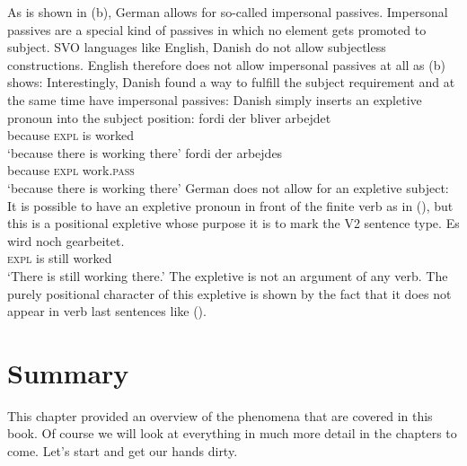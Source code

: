 As is shown in (b), German allows for so-called impersonal passives. Impersonal passives are
a special kind of passives in which no element gets promoted to subject. SVO languages like English,
Danish do not allow subjectless constructions. English therefore does not allow impersonal passives
at all as (b) shows:
\eal
{}
\zl
Interestingly, Danish found a way to fulfill the subject requirement and at the same time have
impersonal passives: Danish simply inserts an expletive pronoun into the subject position:
\eal
\label{ex-bliver-arbejder}
\ex 
\gll fordi der bliver arbejdet\\
     because \textsc{expl} is worked\\\danish
\glt `because there is working there'
\ex
\gll fordi   der arbejdes\\
     because  \textsc{expl} work.\textsc{pass}\\
\glt `because there is working there'
\zl
German does not allow for an expletive subject:
\z
It is possible to have an expletive pronoun in front of the finite verb as in (), but this is
a positional expletive whose purpose it is to mark the V2 sentence type. 
\ea
\gll  Es wird noch gearbeitet.\\
      \textsc{expl} is still worked\\\german
\glt `There is still working there.'
\z
The expletive is not an argument of any verb. The purely positional character of this expletive is shown by the fact that it does not
appear in verb last sentences like ().

\section{Summary}

This chapter provided an overview of the phenomena that are covered in this book. Of course we will
look at everything in much more detail in the chapters to come. Let's start and get our hands dirty.





